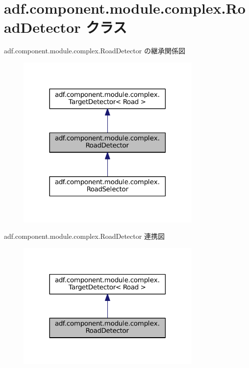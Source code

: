 \hypertarget{classadf_1_1component_1_1module_1_1complex_1_1RoadDetector}{}\section{adf.\+component.\+module.\+complex.\+Road\+Detector クラス}
\label{classadf_1_1component_1_1module_1_1complex_1_1RoadDetector}


adf.\+component.\+module.\+complex.\+Road\+Detector の継承関係図
\nopagebreak
\begin{figure}[H]
\begin{center}
\leavevmode
\includegraphics[width=257pt]{classadf_1_1component_1_1module_1_1complex_1_1RoadDetector__inherit__graph}
\end{center}
\end{figure}


adf.\+component.\+module.\+complex.\+Road\+Detector 連携図
\nopagebreak
\begin{figure}[H]
\begin{center}
\leavevmode
\includegraphics[width=257pt]{classadf_1_1component_1_1module_1_1complex_1_1RoadDetector__coll__graph}
\end{center}
\end{figure}
